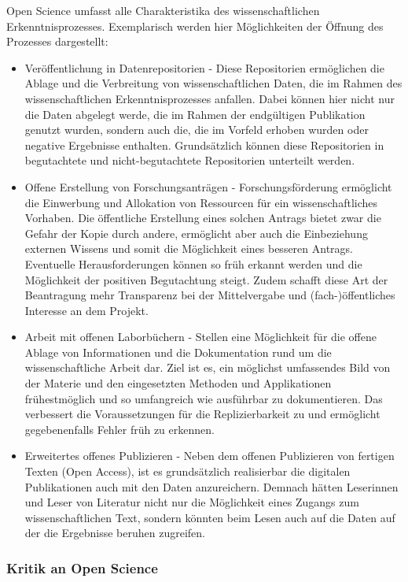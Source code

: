 Open Science umfasst alle Charakteristika des wissenschaftlichen Erkenntnisprozesses. Exemplarisch werden hier Möglichkeiten der Öffnung des Prozesses dargestellt:
\begin{itemize}
\item Veröffentlichung in Datenrepositorien - Diese Repositorien ermöglichen die Ablage und die Verbreitung von wissenschaftlichen Daten, die im Rahmen des wissenschaftlichen Erkenntnisprozesses anfallen. Dabei können hier nicht nur die Daten abgelegt werde, die im Rahmen der endgültigen Publikation genutzt wurden, sondern auch die, die im Vorfeld erhoben wurden oder negative Ergebnisse enthalten. Grundsätzlich können diese Repositorien in begutachtete und nicht-begutachtete Repositorien unterteilt werden.
\item Offene Erstellung von Forschungsanträgen - Forschungsförderung ermöglicht die Einwerbung und Allokation von Ressourcen für ein wissenschaftliches Vorhaben. Die öffentliche Erstellung eines solchen Antrags bietet zwar die Gefahr der Kopie durch andere, ermöglicht aber auch die Einbeziehung externen Wissens und somit die Möglichkeit eines besseren Antrags. Eventuelle Herausforderungen können so früh erkannt werden und die Möglichkeit der positiven Begutachtung steigt. Zudem schafft diese Art der Beantragung mehr Transparenz bei der Mittelvergabe und (fach-)öffentliches Interesse an dem Projekt.
\item Arbeit mit offenen Laborbüchern - Stellen eine Möglichkeit für die offene Ablage von Informationen und die Dokumentation rund um die wissenschaftliche Arbeit dar. Ziel ist es, ein möglichst umfassendes Bild von der Materie und den eingesetzten Methoden und Applikationen frühestmöglich und so umfangreich wie ausführbar zu dokumentieren. Das verbessert die Voraussetzungen für die Replizierbarkeit zu und ermöglicht gegebenenfalls Fehler früh zu erkennen.
\item Erweitertes offenes Publizieren - Neben dem offenen Publizieren von fertigen Texten (Open Access), ist es grundsätzlich realisierbar die digitalen Publikationen auch mit den Daten anzureichern. Demnach hätten Leserinnen und Leser von Literatur nicht nur die Möglichkeit eines Zugangs zum wissenschaftlichen Text, sondern könnten beim Lesen auch auf die Daten auf der die Ergebnisse beruhen zugreifen.
\end{itemize}

\subsubsection{Kritik an Open Science}

